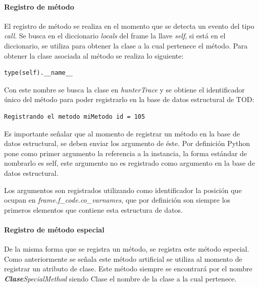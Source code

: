 \documentclass[12pt,legalpaper]{report}
\begin{document}
				\paragraph{Registro de método}

El registro de método se realiza en el momento que se detecta un evento del tipo \textit{call}.  Se busca en el diccionario \textit{locals} del frame la llave \textit{self}, si está en el diccionario, se utiliza para obtener la clase a la cual pertenece el método.  Para obtener la clase asociada al método se realiza lo siguiente:

\begin{singlespace}
\begin{lstlisting}[style=consola,numbers=none]
type(self).__name__
\end{lstlisting}
\end{singlespace}


Con este nombre se busca la clase en \textit{hunterTrace} y se obtiene el identificador único del método para poder registrarlo en la base de datos estructural de TOD:

\begin{singlespace}
\begin{lstlisting}[style=consola,numbers=none]
Registrando el metodo miMetodo id = 105
\end{lstlisting}
\end{singlespace}

Es importante señalar que al momento de registrar un método en la base de datos estructural, se deben enviar los argumento de éste.  Por definición Python pone como primer argumento la referencia a la instancia, la forma estándar de nombrarlo es self, este argumento no es registrado como argumento en la base de datos estructural.

Los argumentos son registrados utilizando como identificador la posición que ocupan en \textit{frame.f\_code.co\_varnames}, que por definición son siempre los primeros elementos que contiene esta estructura de datos.

				\paragraph{Registro de método especial}

De la misma forma que se registra un método, se registra este método especial.  Como anteriormente se señala este método artificial se utiliza al momento de registrar un atributo de clase.  Este método siempre se encontrará por el nombre \textit{\textbf{Clase}SpecialMethod} siendo Clase el nombre de la clase a la cual pertenece.
\end{document}
